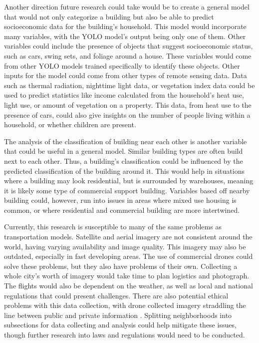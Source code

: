 \documentclass[conference,]{IEEEtran}
\begin{document}
Another direction future research could take would be to create a
general model that would not only categorize a building but also be able
to predict socioeconomic data for the building's household. This model
would incorporate many variables, with the YOLO model's output being
only one of them. Other variables could include the presence of objects
that suggest socioeconomic status, such as cars, swing sets, and foliage
around a house. These variables would come from other YOLO models
trained specifically to identify these objects. Other inputs for the
model could come from other types of remote sensing data. Data such as
thermal radiation, nighttime light data, or vegetation index data could
be used to predict statistics like income calculated from the
household's heat use, light use, or amount of vegetation on a property.
This data, from heat use to the presence of cars, could also give
insights on the number of people living within a household, or whether
children are present.

The analysis of the classification of building near each other is
another variable that could be useful in a general model. Similar
building types are often build next to each other. Thus, a building's
classification could be influenced by the predicted classification of
the building around it. This would help in situations where a building
may look residential, but is surrounded by warehouses, meaning it is
likely some type of commercial support building. Variables based off
nearby building could, however, run into issues in areas where mixed use
housing is common, or where residential and commercial building are more
intertwined.

Currently, this research is susceptible to many of the same problems as
transportation models. Satellite and aerial imagery are not consistent
around the world, having varying availability and image quality. This
imagery may also be outdated, especially in fast developing areas. The
use of commercial drones could solve these problems, but they also have
problems of their own. Collecting a whole city's worth of imagery would
take time to plan logistics and photograph. The flights would also be
dependent on the weather, as well as local and national regulations that
could present challenges. There are also potential ethical problems with
this data collection, with drone collected imagery straddling the line
between public and private information \autocite{hall_use_2021}.
Splitting neighborhoods into subsections for data collecting and
analysis could help mitigate these issues, though further research into
laws and regulations would need to be conducted.

\balance

\printbibliography[title=References]
\end{document}
